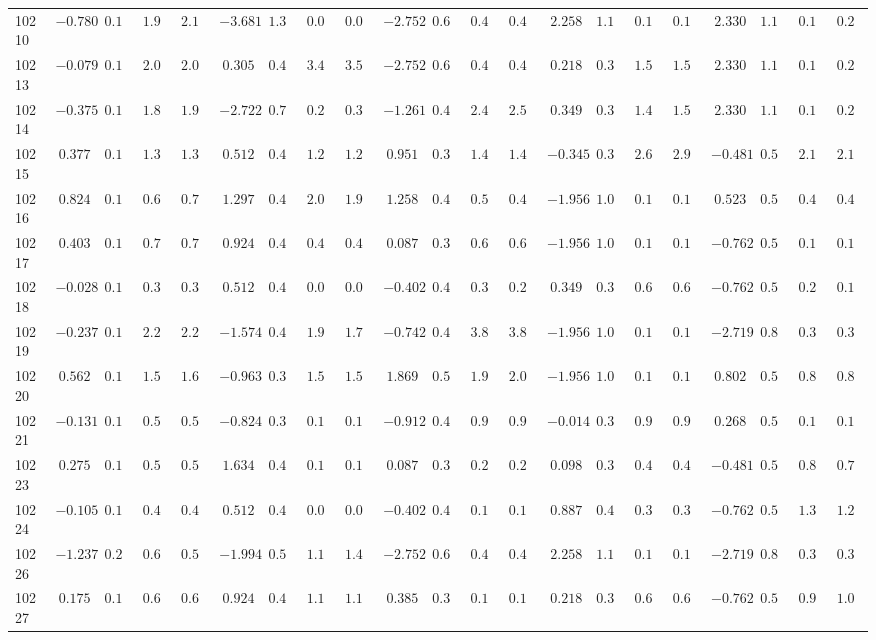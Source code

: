 \begin{landscape}
{\begin{longtable}{l|rrrr|rrrr|rrrr|rrrr|rrrr}
10210&$-0.780$&$0.188$&$1.937$&$2.140$&$-3.681$&$1.306$&$0.087$&$0.095$&$-2.752$&$0.671$&$0.419$&$0.418$&$ 2.258$&$1.137$&$0.144$&$0.139$&$ 2.330$&$1.198$&$0.174$&$0.222$\tabularnewline
10213&$-0.079$&$0.161$&$2.095$&$2.075$&$ 0.305$&$0.437$&$3.401$&$3.535$&$-2.752$&$0.671$&$0.419$&$0.418$&$ 0.218$&$0.370$&$1.597$&$1.525$&$ 2.330$&$1.198$&$0.174$&$0.222$\tabularnewline
10214&$-0.375$&$0.169$&$1.851$&$1.920$&$-2.722$&$0.762$&$0.275$&$0.329$&$-1.261$&$0.432$&$2.481$&$2.574$&$ 0.349$&$0.386$&$1.469$&$1.526$&$ 2.330$&$1.198$&$0.174$&$0.222$\tabularnewline
10215&$ 0.377$&$0.161$&$1.305$&$1.319$&$ 0.512$&$0.443$&$1.219$&$1.216$&$ 0.951$&$0.394$&$1.433$&$1.442$&$-0.345$&$0.363$&$2.636$&$2.908$&$-0.481$&$0.528$&$2.122$&$2.112$\tabularnewline
10216&$ 0.824$&$0.180$&$0.669$&$0.717$&$ 1.297$&$0.422$&$2.059$&$1.974$&$ 1.258$&$0.420$&$0.508$&$0.499$&$-1.956$&$1.082$&$0.145$&$0.149$&$ 0.523$&$0.538$&$0.455$&$0.438$\tabularnewline
10217&$ 0.403$&$0.162$&$0.749$&$0.729$&$ 0.924$&$0.438$&$0.483$&$0.470$&$ 0.087$&$0.394$&$0.677$&$0.699$&$-1.956$&$1.082$&$0.145$&$0.149$&$-0.762$&$0.547$&$0.128$&$0.127$\tabularnewline
10218&$-0.028$&$0.161$&$0.361$&$0.358$&$ 0.512$&$0.443$&$0.056$&$0.057$&$-0.402$&$0.408$&$0.301$&$0.299$&$ 0.349$&$0.386$&$0.621$&$0.685$&$-0.762$&$0.547$&$0.205$&$0.198$\tabularnewline
10219&$-0.237$&$0.165$&$2.223$&$2.282$&$-1.574$&$0.438$&$1.936$&$1.702$&$-0.742$&$0.415$&$3.805$&$3.809$&$-1.956$&$1.082$&$0.145$&$0.149$&$-2.719$&$0.854$&$0.301$&$0.304$\tabularnewline
10220&$ 0.562$&$0.166$&$1.539$&$1.641$&$-0.963$&$0.386$&$1.536$&$1.549$&$ 1.869$&$0.531$&$1.941$&$2.034$&$-1.956$&$1.082$&$0.145$&$0.149$&$ 0.802$&$0.573$&$0.820$&$0.881$\tabularnewline
10221&$-0.131$&$0.162$&$0.539$&$0.554$&$-0.824$&$0.383$&$0.100$&$0.100$&$-0.912$&$0.418$&$0.933$&$0.923$&$-0.014$&$0.353$&$0.960$&$0.970$&$ 0.268$&$0.520$&$0.127$&$0.131$\tabularnewline
10223&$ 0.275$&$0.160$&$0.574$&$0.546$&$ 1.634$&$0.410$&$0.165$&$0.162$&$ 0.087$&$0.394$&$0.204$&$0.204$&$ 0.098$&$0.359$&$0.463$&$0.438$&$-0.481$&$0.528$&$0.829$&$0.774$\tabularnewline
10224&$-0.105$&$0.162$&$0.456$&$0.456$&$ 0.512$&$0.443$&$0.056$&$0.057$&$-0.402$&$0.408$&$0.176$&$0.177$&$ 0.887$&$0.493$&$0.363$&$0.325$&$-0.762$&$0.547$&$1.357$&$1.257$\tabularnewline
10226&$-1.237$&$0.228$&$0.625$&$0.561$&$-1.994$&$0.519$&$1.113$&$1.469$&$-2.752$&$0.671$&$0.419$&$0.418$&$ 2.258$&$1.137$&$0.144$&$0.139$&$-2.719$&$0.854$&$0.301$&$0.304$\tabularnewline
10227&$ 0.175$&$0.160$&$0.643$&$0.614$&$ 0.924$&$0.438$&$1.125$&$1.129$&$ 0.385$&$0.386$&$0.160$&$0.163$&$ 0.218$&$0.370$&$0.636$&$0.640$&$-0.762$&$0.547$&$0.949$&$1.009$\tabularnewline

\end{longtable}}
\end{landscape}
